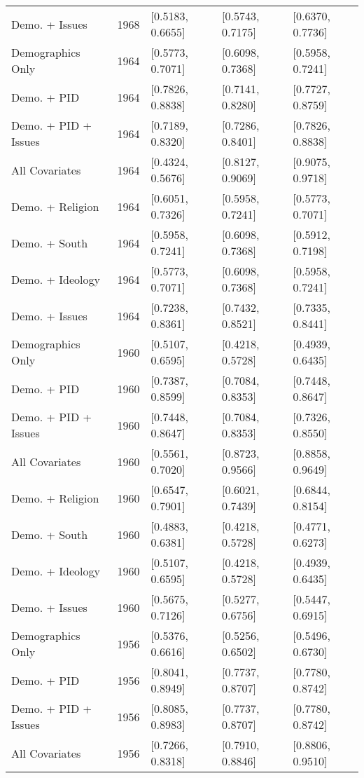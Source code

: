\begin{longtable}{lrlll}
  Demo. + Issues & 1968 & [0.5183, 0.6655] & [0.5743, 0.7175] & [0.6370, 0.7736] \\ 
  Demographics Only & 1964 & [0.5773, 0.7071] & [0.6098, 0.7368] & [0.5958, 0.7241] \\ 
  Demo. + PID & 1964 & [0.7826, 0.8838] & [0.7141, 0.8280] & [0.7727, 0.8759] \\ 
  Demo. + PID + Issues & 1964 & [0.7189, 0.8320] & [0.7286, 0.8401] & [0.7826, 0.8838] \\ 
  All Covariates & 1964 & [0.4324, 0.5676] & [0.8127, 0.9069] & [0.9075, 0.9718] \\ 
  Demo. + Religion & 1964 & [0.6051, 0.7326] & [0.5958, 0.7241] & [0.5773, 0.7071] \\ 
  Demo. + South & 1964 & [0.5958, 0.7241] & [0.6098, 0.7368] & [0.5912, 0.7198] \\ 
  Demo. + Ideology & 1964 & [0.5773, 0.7071] & [0.6098, 0.7368] & [0.5958, 0.7241] \\ 
  Demo. + Issues & 1964 & [0.7238, 0.8361] & [0.7432, 0.8521] & [0.7335, 0.8441] \\ 
  Demographics Only & 1960 & [0.5107, 0.6595] & [0.4218, 0.5728] & [0.4939, 0.6435] \\ 
  Demo. + PID & 1960 & [0.7387, 0.8599] & [0.7084, 0.8353] & [0.7448, 0.8647] \\ 
  Demo. + PID + Issues & 1960 & [0.7448, 0.8647] & [0.7084, 0.8353] & [0.7326, 0.8550] \\ 
  All Covariates & 1960 & [0.5561, 0.7020] & [0.8723, 0.9566] & [0.8858, 0.9649] \\ 
  Demo. + Religion & 1960 & [0.6547, 0.7901] & [0.6021, 0.7439] & [0.6844, 0.8154] \\ 
  Demo. + South & 1960 & [0.4883, 0.6381] & [0.4218, 0.5728] & [0.4771, 0.6273] \\ 
  Demo. + Ideology & 1960 & [0.5107, 0.6595] & [0.4218, 0.5728] & [0.4939, 0.6435] \\ 
  Demo. + Issues & 1960 & [0.5675, 0.7126] & [0.5277, 0.6756] & [0.5447, 0.6915] \\ 
  Demographics Only & 1956 & [0.5376, 0.6616] & [0.5256, 0.6502] & [0.5496, 0.6730] \\ 
  Demo. + PID & 1956 & [0.8041, 0.8949] & [0.7737, 0.8707] & [0.7780, 0.8742] \\ 
  Demo. + PID + Issues & 1956 & [0.8085, 0.8983] & [0.7737, 0.8707] & [0.7780, 0.8742] \\ 
  All Covariates & 1956 & [0.7266, 0.8318] & [0.7910, 0.8846] & [0.8806, 0.9510] \\ 

\end{longtable}
